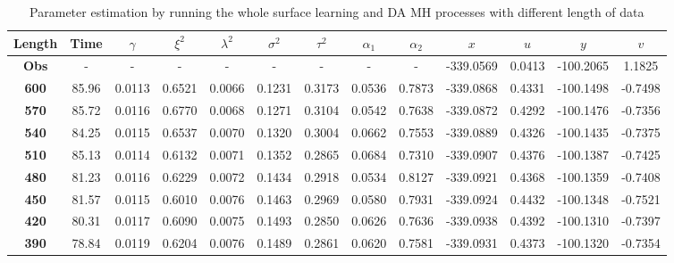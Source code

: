 \begin{landscape}
\begin{table}[h]
\centering
\caption{Parameter estimation by running the whole surface learning and DA MH processes with different length of data}
\begin{tabular}{|c|c|c|c|c|c|c|c|c|c|c|c|c|}
\hline
\textbf{Length} & \textbf{Time} & $\gamma$ & $\xi^2$ & $\lambda^2$ & $\sigma^2$ & $\tau^2$ & $\alpha_1$ & $\alpha_2$ &$x$ & $u$ &$y$&$v$\\ \hline
\textbf{Obs}    & -             & -              & -            & -              & -               & -             & -           & -           & -339.0569  & 0.0413      & -100.2065  & 1.1825      \\ \hline
\textbf{600}    & 85.96         & 0.0113         & 0.6521       & 0.0066         & 0.1231          & 0.3173        & 0.0536      & 0.7873      & -339.0868  & 0.4331      & -100.1498  & -0.7498     \\ \hline
\textbf{570}    & 85.72         & 0.0116         & 0.6770       & 0.0068         & 0.1271          & 0.3104        & 0.0542      & 0.7638      & -339.0872  & 0.4292      & -100.1476  & -0.7356     \\ \hline
\textbf{540}    & 84.25         & 0.0115         & 0.6537       & 0.0070         & 0.1320          & 0.3004        & 0.0662      & 0.7553      & -339.0889  & 0.4326      & -100.1435  & -0.7375     \\ \hline
\textbf{510}    & 85.13         & 0.0114         & 0.6132       & 0.0071         & 0.1352          & 0.2865        & 0.0684      & 0.7310      & -339.0907  & 0.4376      & -100.1387  & -0.7425     \\ \hline
\textbf{480}    & 81.23         & 0.0116         & 0.6229       & 0.0072         & 0.1434          & 0.2918        & 0.0534      & 0.8127      & -339.0921  & 0.4368      & -100.1359  & -0.7408     \\ \hline
\textbf{450}    & 81.57         & 0.0115         & 0.6010       & 0.0076         & 0.1463          & 0.2969        & 0.0580      & 0.7931      & -339.0924  & 0.4432      & -100.1348  & -0.7521     \\ \hline
\textbf{420}    & 80.31         & 0.0117         & 0.6090       & 0.0075         & 0.1493          & 0.2850        & 0.0626      & 0.7636      & -339.0938  & 0.4392      & -100.1310  & -0.7397     \\ \hline
\textbf{390}    & 78.84         & 0.0119         & 0.6204       & 0.0076         & 0.1489          & 0.2861        & 0.0620      & 0.7581      & -339.0931  & 0.4373      & -100.1320  & -0.7354     \\ \hline

\end{tabular}
\end{table}
\end{landscape}
